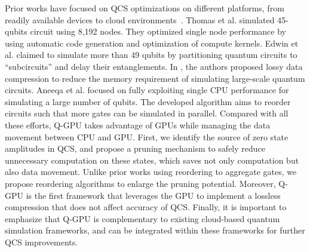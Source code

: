 Prior works have focused on QCS optimizations on different platforms, from readily available devices to cloud environments~\cite{10.48550/arXiv.1601.07195,10.1145/3295500.3356155,10.48550/arXiv.1710.05867,10.1145/3126908.3126947,10.1109/HPCA51647.2021.00026,10.48550/arXiv.1910.09534,10.48550/arXiv.2005.06787,10.1109/TCAD.2018.2834427}. 
Thomas et al. \cite{10.1145/3126908.3126947} simulated 45-qubits circuit using 8,192 nodes. They optimized single node performance by using automatic code generation and optimization of compute kernels. 
Edwin et al. \cite{10.48550/arXiv.1710.05867} claimed to simulate more than 49 qubits by partitioning quantum circuits to ``subcircuits'' and delay their entanglements. 
In \cite{10.1145/3295500.3356155}, the authors proposed lossy data compression to reduce the memory requirement of simulating large-scale quantum circuits. 
Aneeqa et al. \cite{10.1109/HPCA51647.2021.00026} focused on fully exploiting single CPU performance for simulating a large number of qubits. The developed algorithm aims to reorder circuits such that more gates can be simulated in parallel.
Compared with all these efforts, Q-GPU takes advantage of GPUs while managing the data movement between CPU and GPU. 
First, we identify the source of zero state amplitudes in QCS, and propose a pruning mechanism to safely reduce unnecessary computation on these states, which saves not only computation but also data movement.
Unlike prior works using reordering to aggregate gates, \cite{10.1109/HPCA51647.2021.00026,10.1145/3498325,10.1145/3297858.3304018} 
we propose reordering algorithms to enlarge the pruning potential. Moreover, Q-GPU is the first framework that leverages the GPU to implement a lossless compression that does not affect accuracy of QCS.  Finally, it is important to emphasize that Q-GPU is complementary to existing cloud-based quantum simulation frameworks, and can be integrated within these frameworks for further QCS improvements.

